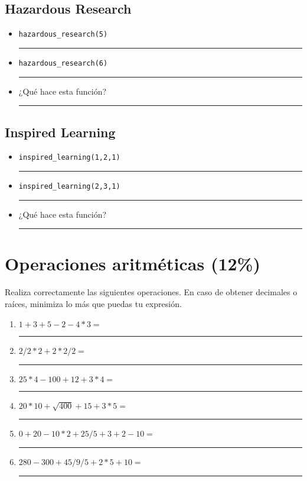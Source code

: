 \documentclass[11pt]{article}
\newcommand{\matlab}[1]{\lstinline[style=Matlab-bw]!#1!}
\newcommand{\shortresponserule}{{\large\rule{5 cm}{0.3mm}}}
\newcommand{\responserule}{{\large\rule{10 cm}{0.3mm}}}
\begin{document}
\pagebreak

\subsection*{Hazardous Research}


\begin{itemize}
    \item \matlab{hazardous_research(5)} \hfill \shortresponserule
    \item \matlab{hazardous_research(6)} \hfill \shortresponserule
    \item ¿Qué hace esta función? \hfill \responserule
\end{itemize}

\subsection*{Inspired Learning}


\begin{itemize}
    \item \matlab{inspired_learning(1,2,1)} \hfill \shortresponserule
    \item \matlab{inspired_learning(2,3,1)} \hfill \shortresponserule
    \item ¿Qué hace esta función? \hfill \responserule
\end{itemize}

\section{Operaciones aritméticas (12\%)}

Realiza correctamente las siguientes operaciones.
En caso de obtener decimales o raíces, minimiza lo más que puedas tu expresión.

\begin{enumerate}[label=\alph*)]
    \item $1 + 3 + 5 - 2 - 4 * 3 =$ \hfill \shortresponserule
    \item $2 / 2 * 2 + 2 * 2 / 2 =$ \hfill \shortresponserule
    \item $25 * 4 - 100 + 12 + 3 * 4 =$ \hfill \shortresponserule
    \item $20 * 10 + \sqrt{400} + 15 + 3 * 5 =$ \hfill \shortresponserule
    \item $0 + 20 - 10 * 2 + 25 / 5 + 3 + 2 - 10 =$ \hfill \shortresponserule
    \item $280 - 300 + 45 / 9 / 5 + 2 * 5 + 10 =$ \hfill \shortresponserule
\end{enumerate}
\end{document}
